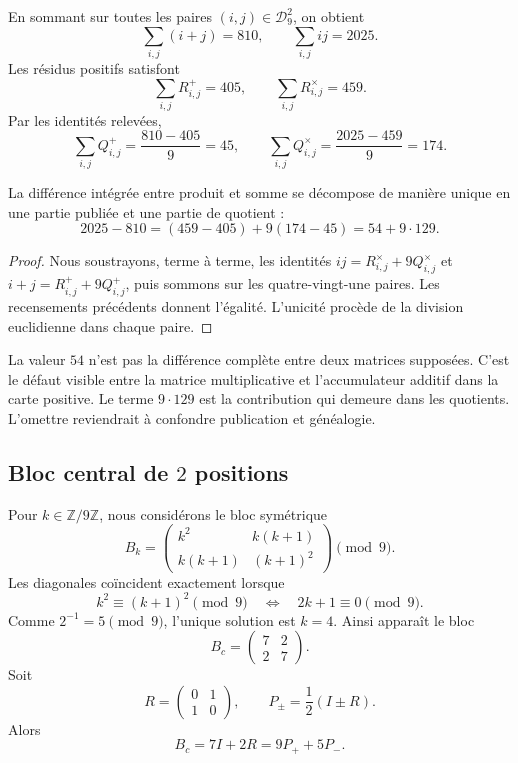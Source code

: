 En sommant sur toutes les paires \((i,j)\in\mathcal D_9^2\), on obtient
\[
 \sum_{i,j}(i+j)=810,
 \qquad
 \sum_{i,j}ij=2025.
\]
Les résidus positifs satisfont
\[
 \sum_{i,j}R^+_{i,j}=405,
 \qquad
 \sum_{i,j}R^\times_{i,j}=459.
\]
Par les identités relevées,
\[
 \sum_{i,j}Q^+_{i,j}=\frac{810-405}{9}=45,
 \qquad
 \sum_{i,j}Q^\times_{i,j}=\frac{2025-459}{9}=174.
\]

\begin{theorem}
\label{p12-83-c1-s1:thm:app-separacion-exceso}
La différence intégrée entre produit et somme se décompose de manière unique
en une partie publiée et une partie de quotient :
\[
 \boxed{
  2025-810
  =(459-405)+9(174-45)
  =54+9\cdot129.}
\]
\end{theorem}

\begin{proof}
Nous soustrayons, terme à terme, les identités
\(ij=R^\times_{i,j}+9Q^\times_{i,j}\) et
\(i+j=R^+_{i,j}+9Q^+_{i,j}\), puis sommons sur les quatre-vingt-une paires. Les
recensements précédents donnent l’égalité. L’unicité procède de la division
euclidienne dans chaque paire.
\end{proof}

La valeur \(54\) n’est pas la différence complète entre deux matrices supposées.
C’est le défaut visible entre la matrice multiplicative et l’accumulateur additif
dans la carte positive. Le terme \(9\cdot129\) est la contribution
qui demeure dans les quotients. L’omettre reviendrait à confondre publication et
généalogie.

\subsection{Bloc central de \(2\) positions}

Pour \(k\in\mathbb Z/9\mathbb Z\), nous considérons le bloc symétrique
\[
 B_k=
 \begin{pmatrix}
  k^2&k(k+1)\\
  k(k+1)&(k+1)^2
 \end{pmatrix}\pmod9.
\]
Les diagonales coïncident exactement lorsque
\[
 k^2\equiv(k+1)^2\pmod9
 \quad\Longleftrightarrow\quad
 2k+1\equiv0\pmod9.
\]
Comme \(2^{-1}=5\pmod9\), l’unique solution est \(k=4\). Ainsi apparaît le
bloc
\[
 B_c=
 \begin{pmatrix}7&2\\2&7\end{pmatrix}.
\]
Soit
\[
 R=\begin{pmatrix}0&1\\1&0\end{pmatrix},
 \qquad
 P_\pm=\frac12(I\pm R).
\]
Alors
\[
 B_c=7I+2R=9P_++5P_-.
\]

